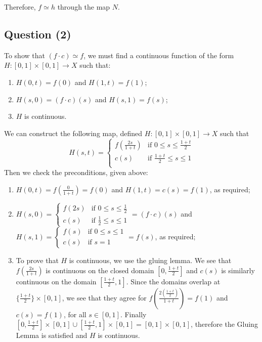 \documentclass{article}
\begin{document}
\begin{flushleft}
\begin{enumerate}[label=(\roman*)]
        Therefore, $f \simeq h$ through the map $N$.
    \end{enumerate}
\end{flushleft}
\begin{center}
\section*{Question (2)}
\end{center}

\begin{flushleft}
To show that $(f \cdot c) \simeq f$, we must find a continuous function of the form $H : [0,1] \times [0,1] \rightarrow X$ such that:
    \begin{enumerate}[label=\arabic*)]
        \item $H(0,t) = f(0)$ and $H(1,t) = f(1)$;
        \item $H(s,0) = (f \cdot c)(s)$ and $H(s,1) = f(s)$;
        \item $H$ is continuous.
    \end{enumerate}
We can construct the following map, defined $H : [0,1] \times [0,1] \rightarrow X$ such that 
    \[ H(s,t) =
    \begin{cases}
        f(\frac{2s}{1+t}) & \text{if } 0 \leq s \leq \frac{1+t}{2} \\
        c(s) & \text{if } \frac{1+t}{2} \leq s \leq 1 \\ 
    \end{cases} 
    \]
Then we check the preconditions, given above:
    \begin{enumerate}[label=\arabic*)]
        \item $H(0, t) = f(\frac{0}{1+t}) = f(0)$ and $H(1, t) = c(s) = f(1)$, as required;
        \item $H(s, 0) = 
            \begin{cases}
                f(2s) & \text{if } 0 \leq s \leq \frac{1}{2} \\ 
                c(s) & \text{if } \frac{1}{2} \leq s \leq 1
            \end{cases} = (f \cdot c)(s)$ 
        and $H(s, 1) =
        \begin{cases}
                f(s) & \text{if } 0 \leq s \leq 1  \\ 
                c(s) & \text{if } s = 1 
        \end{cases} = f(s)$, as required;
        \item To prove that $H$ is continuous, we use the gluing lemma. We see that $f(\frac{2s}{1+t})$ is continuous on the closed domain $[0,\frac{1+t}{2}]$ and $c(s)$ is similarly continuous on the domain $[\frac{1+t}{2}, 1]$. Since the domains overlap at $\{\frac{1+t}{2}\} \times [0,1]$, we see that they agree for $f(\frac{2(\frac{1+t}{2})}{1+t}) = f(1)$ and $c(s) = f(1)$, for all $s \in [0,1]$. Finally $[0, \frac{1+t}{2}] \times [0,1] \cup [\frac{1+t}{2}, 1] \times [0,1] = [0,1] \times [0,1]$, therefore the Gluing Lemma is satisfied and $H$ is continuous.
    \end{enumerate}
\end{flushleft}
\end{document}
